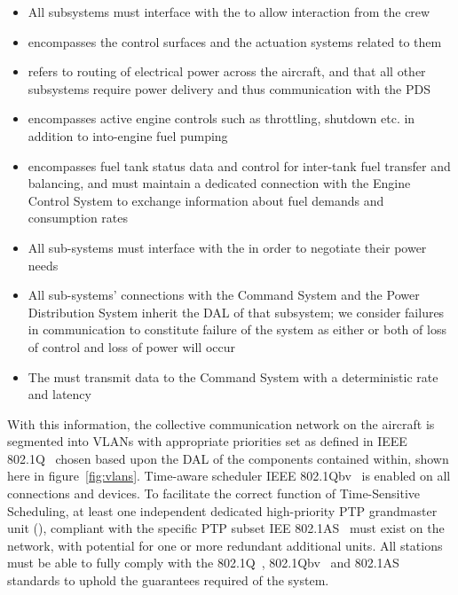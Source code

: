 \begin{itemize}
    \item All subsystems must interface with the  to allow interaction from the crew
    \item {} encompasses the control surfaces and the actuation systems related to them
    \item {} refers to routing of electrical power across the aircraft, and that all other subsystems require power delivery and thus communication with the PDS
    \item {} encompasses active engine controls such as throttling, shutdown etc. in addition to into-engine fuel pumping
    \item {} encompasses fuel tank status data and control for inter-tank fuel transfer and balancing, and must maintain a dedicated connection with the Engine Control System to exchange information about fuel demands and consumption rates
    \item All sub-systems must interface with the  in order to negotiate their power needs
    \item All sub-systems' connections with the Command System and the Power Distribution System inherit the DAL of that subsystem; we consider failures in communication to constitute failure of the system as either or both of loss of control and loss of power will occur
    \item The  must transmit data to the Command System with a deterministic rate and latency
\end{itemize}

With this information, the collective communication network on the aircraft is segmented into VLANs with appropriate priorities set as defined in IEEE 802.1Q~\cite{IEEEStandardLocal2022} chosen based upon the DAL of the components contained within, shown here in figure~\ref{fig:vlans}.
Time-aware scheduler IEEE 802.1Qbv~\cite{IEEEStandardLocal2018a,ISOIECIEEE2018} is enabled on all connections and devices.
To facilitate the correct function of Time-Sensitive Scheduling, at least one independent dedicated high-priority PTP grandmaster unit (), compliant with the specific PTP subset IEE 802.1AS~\cite{IEEEStandardLocal2020} must exist on the network, with potential for one or more redundant additional units.
All stations must be able to fully comply with the 802.1Q~\cite{IEEEStandardLocal2018a}, 802.1Qbv~\cite{IEEEStandardLocal2016a} and 802.1AS~\cite{IEEEStandardLocal2020} standards to uphold the guarantees required of the system.

